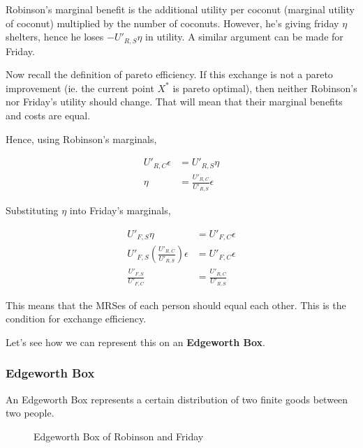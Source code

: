\documentclass[11pt]{scrartcl}
\begin{document}
Robinson's marginal benefit is the additional utility per coconut (marginal utility of coconut) multiplied by the number of coconuts. However, he's giving friday $\eta$ shelters, hence he loses $-U'_{R,S} \eta$ in utility. A similar argument can be made for Friday.

Now recall the definition of pareto efficiency. If this exchange is not a pareto improvement (ie. the current point $X^*$ is pareto optimal), then neither Robinson's nor Friday's utility should change. That will mean that their marginal benefits and costs are equal.

Hence, using Robinson's marginals,

\begin{align*}
U'_{R,C} \epsilon &= U'_{R,S} \eta \\
\eta &= \frac{U'_{R,C}}{U'_{R,S}} \epsilon
\end{align*}

Substituting $\eta$ into Friday's marginals,

\begin{align*}
U'_{F,S} \eta &= U'_{F,C} \epsilon \\
U'_{F,S} \left( \frac{U'_{R,C}}{U'_{R,S}} \right) \epsilon &= U'_{F,C} \epsilon \\
\frac{U'_{F,S}}{U'_{F,C}} &= \frac{U'_{R,C}}{U'_{R,S}}
\end{align*}

This means that the MRSes of each person should equal each other. This is the condition for exchange efficiency.

Let's see how we can represent this on an \textbf{Edgeworth Box}.

\subsubsection{Edgeworth Box}

An Edgeworth Box represents a certain distribution of two finite goods between two people.



\begin{figure}[H]
\centering
{}
\caption{Edgeworth Box of Robinson and \color{blue} Friday}
\end{figure}
\end{document}
